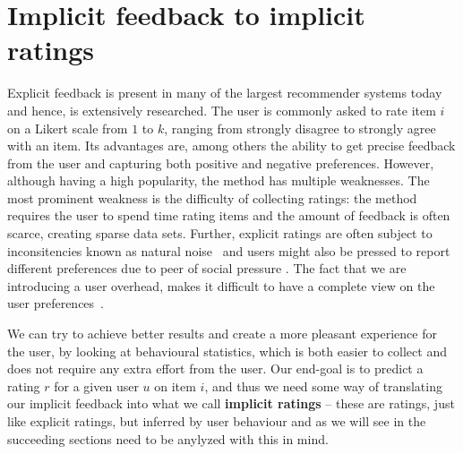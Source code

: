 




\section{Implicit feedback to implicit ratings}


Explicit feedback is present in many of the largest recommender systems today
and hence, is extensively researched. The user is commonly asked to
rate item $i$ on a Likert scale from $1$ to $k$, ranging from strongly
disagree to strongly agree with an item. Its advantages are, among others the
ability to get precise feedback from the user and capturing both positive and
negative preferences. However, although having a high popularity, the method
has multiple weaknesses. The most prominent weakness is the difficulty of
collecting ratings: the method requires the user to spend time rating items and
the amount of feedback is often scarce, creating sparse data sets. Further,
explicit ratings are often subject to inconsitencies known as natural
noise~\cite{amatriain2009like} and users might also be pressed to report
different preferences due to peer of social pressure . The fact that we are
introducing a user overhead, makes it difficult to have a complete view on the
user preferences~\cite{Jawaheer2010}.

We can try to achieve better results and create a more pleasant experience for
the user, by looking at behavioural statistics, which is both easier to collect
and does not require any extra effort from the user. Our end-goal is to predict
a rating $r$ for a given user $u$ on item $i$, and thus we need some way of
translating our implicit feedback into what we call \textbf{implicit ratings} –
these are ratings, just like explicit ratings, but inferred by user behaviour
and as we will see in the succeeding sections need to be anylyzed with this in
mind.

